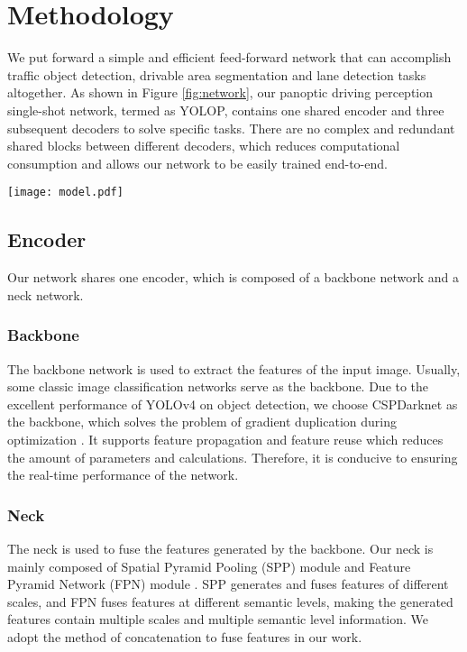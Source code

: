 \documentclass[10pt,twocolumn,letterpaper]{article}
\begin{document}
\section{Methodology}

We put forward a simple and efficient feed-forward network that can accomplish traffic object detection, drivable area segmentation and lane detection tasks altogether. As shown in Figure \ref{fig:network}, our panoptic driving perception  single-shot network, termed as YOLOP, contains one shared encoder and three subsequent decoders to solve specific tasks. There are no complex and redundant shared blocks between different decoders, which reduces computational consumption and allows our network to be easily trained end-to-end.

\begin{figure*}
\begin{center}
\texttt{[image: model.pdf]}
\end{center}
   \caption{The architecture of YOLOP. YOLOP shares one encoder and combines three decoders to solve different tasks. The encoder consists of a backbone and a neck.}
\label{fig:network}
\end{figure*}


\subsection{Encoder}
Our network shares one encoder, which is composed of a backbone network and a neck network.

\subsubsection{Backbone}
The backbone network is used to extract the features of the input image. Usually, some classic image classification networks serve as the backbone. Due to the excellent performance of YOLOv4 \cite{yolov4} on object detection, we choose CSPDarknet \cite{cspdarknet} as the backbone, which solves the problem of gradient duplication during optimization \cite{cspnet}. It supports feature propagation and feature reuse which reduces the amount of parameters and calculations. Therefore, it is conducive to ensuring the real-time performance of the network.

\subsubsection{Neck}
The neck is used to fuse the features generated by the backbone. Our neck is mainly composed of Spatial Pyramid Pooling (SPP) module \cite{sppnet} and Feature Pyramid Network (FPN) module \cite{fpn}. SPP generates and fuses features of different scales, and FPN fuses features at different semantic levels, making the generated features contain multiple scales and multiple semantic level information. We adopt the method of concatenation to fuse features in our work.
\end{document}
